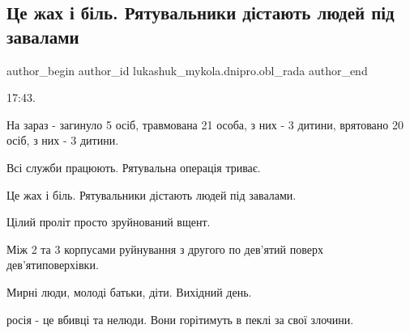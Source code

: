  
 
 
 
 

\subsection{Це жах і біль. Рятувальники дістають людей під завалами}
\label{sec:14_01_2023.fb.lukashuk_mykola.dnipro.obl_rada.1.tse_zhakh___b_l__rya}

\ifcmt
 author_begin
   author_id lukashuk_mykola.dnipro.obl_rada
 author_end
\fi

17:43.

На зараз - загинуло 5 осіб, травмована 21 особа, з них - 3 дитини, врятовано 20
осіб, з них - 3 дитини.

Всі служби працюють. Рятувальна операція триває.

Це жах і біль. Рятувальники дістають людей під завалами.

Цілий проліт просто зруйнований вщент. 

Між 2 та 3 корпусами руйнування з другого по дев'ятий поверх дев'ятиповерхівки. 

Мирні люди, молоді батьки, діти. Вихідний день.

росія - це вбивці та нелюди. Вони горітимуть в пеклі за свої злочини.
